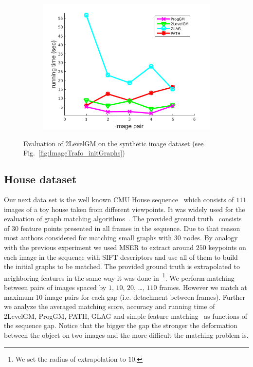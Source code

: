 \begin{figure}[h]
\begin{subfigure}[b]{0.32\textwidth}
			\includegraphics[scale=0.25]{"chapter3/fig/ImageTrafo/anchor_descr/using_cpd_afftrafo/performance/time1"}
		\end{subfigure} 	
	\caption[Evaluation of 2LevelGM on the synthetic image dataset (see Fig.~\ref{fig:ImageTrafo_initGraphs})]{Evaluation of 2LevelGM on the synthetic image dataset (see Fig.~\ref{fig:ImageTrafo_initGraphs})}
	 \label{fig:ImageTrafo}
\end{figure}

\subsection{House dataset}
Our next data set is the well known CMU House sequence~\cite{CMUHouse} which consists of $111$ images of a toy house taken from different viewpoints. It was widely used for the evaluation of graph matching algorithms~\cite{Armiti2014,Hancock_ModalClusters,Cho2010_RRWM,Duchenne2011,FastPFP,Hancock_EM_SVD}. The provided ground truth~\cite{CMUHouse_GT} consists of $30$ feature points presented in all frames in the sequence. Due to that reason most authors considered for matching small graphs with $30$ nodes. By analogy with the previous experiment we used MSER to extract around $250$ keypoints on each image in the sequence with SIFT descriptors and use all of them to build the initial graphs to be matched. The provided ground truth is extrapolated to neighboring features in the same way it was done in~\cite{Cho2012_ProgressiveGM}\footnote{We set the radius of extrapolation to $10$.}. We perform matching between pairs of images spaced by $1$, $10$, $20$, \dots, $110$ frames. However we match at maximum $10$ image pairs for each gap (i.e. detachment between frames). Further we  analyze the averaged matching score, accuracy and running time of 2LevelGM, ProgGM, PATH, GLAG  and simple feature matching~\cite{Lowe2004} as functions of the sequence gap. Notice that the bigger the gap the stronger the deformation between the object on two images and the more difficult the matching problem is. 

